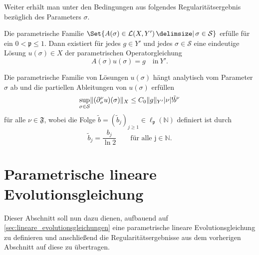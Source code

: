 Weiter erhält man unter den Bedingungen aus  folgendes Regularitätsergebnis bezüglich des Parameters $\sigma$.

\begin{Satz}
\label{thm:kunoth:theorem4}
    Die parametrische Familie $\Set{ A(\sigma) \in \mathcal L(X, Y') \given \sigma \in \mathcal S }$ erfülle  für ein $0 < \mathfrak p \leq 1$.
    Dann existiert für jedes $g \in Y'$ und jedes $\sigma \in \mathcal S$ eine eindeutige Lösung $u(\sigma) \in X$ der parametrischen Operatorgleichung
    \begin{equation}
        A(\sigma) u(\sigma) = g \quad \text{in}~Y'.
    \end{equation}

    Die parametrische Familie von Lösungen $u(\sigma)$ hängt analytisch vom Parameter $\sigma$ ab und die partiellen Ableitungen von $u(\sigma)$ erfüllen
    \begin{equation}
        \label{eq:kunoth:schranke_part_abl}
        \sup_{\sigma \in \mathcal S} \lVert(\partial^{\nu}_{\sigma} u)(\sigma)\rVert_{X} \leq C_{0} \lVert g\rVert_{Y'} \lvert\nu\rvert! \tilde{b}^{\nu}
    \end{equation}
    für alle $\nu \in \mathfrak F$, wobei die Folge $\tilde{b} = (\tilde{b}_{j})_{j \geq 1} \in \ell_{\mathfrak p}(\mathbb{N})$ definiert ist durch
    \begin{equation}
        \tilde{b}_{j} = \frac{b_{j}}{\ln 2} \qquad \text{für alle j} \in \mathbb{N}.
    \end{equation}

    \begin{Beweis}
    \end{Beweis}
\end{Satz}


\section{Parametrische lineare Evolutionsgleichung} %
\label{sec:parametrische_lineare_evolutionsgleichung}

Dieser Abschnitt soll nun dazu dienen, aufbauend auf \autoref{sec:lineare_evolutionsgleichungen} eine parametrische lineare Evolutionsgleichung zu definieren und anschließend die Regularitätsergebnisse aus dem vorherigen Abschnitt auf diese zu übertragen.

